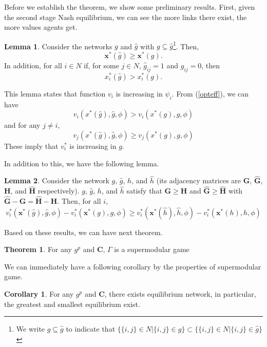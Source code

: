 \documentclass[12pt]{article}
\theoremstyle{definition}
\newtheorem{theorem}{Theorem}
\newtheorem{lemma}{Lemma}
\newtheorem{corollary}{Corollary}
\newcommand{\bm}[1]{\boldsymbol{#1}}
\begin{document}
Before we establish the theorem, we show some preliminary results.
First, given the second stage Nash equilibrium, we can see the more links there exist, the more values agents get.

\begin{lemma}
	Consider the networks $g$ and $\hat{g}$ with $g \subseteq \hat{g}$\footnote{We write $g \subseteq \hat{g}$ to indicate that $\{\{i,j\} \in N | \{i,j\} \in g\} \subset \{\{i,j\} \in N | \{i,j\} \in \hat{g}\}$}.
	Then,
	\[ \bm{x}^*(\hat{g}) \ge \bm{x}^*(g). \]
	In addition, for all $i \in N$ if, for some $j \in N$, $\hat{g}_{ij} = 1$ and $g_{ij} = 0$, then
	\[ x_i^*(\hat{g}) > x_i^*(g). \]
\end{lemma}

This lemma states that function $v_i$ is increasing in $\psi_i$.
From (\ref{opteff}), we can have 
\[ v_i(x^*(\hat{g}), \hat{g}, \phi) > v_i(x^*(g), g, \phi)\]
and for any $j \neq i$,
\[ v_j(x^*(\hat{g}), \hat{g}, \phi) \ge v_j(x^*(g), g, \phi)\]
These imply that $v_i^*$ is increasing in $g$.

In addition to this, we have the following lemma.

\begin{lemma}
	Consider the network $g$, $\hat{g}$, $h$, and $\hat{h}$ (its adjacency matrices are $\bm{G}$, $\bm{\hat{G}}$, $\bm{H}$, and $\bm{\hat{H}}$ respectively).
	$g$, $\hat{g}$, $h$, and $\hat{h}$ satisfy that $\bm{G} \ge \bm{H}$ and  $\bm{\hat{G}} \ge \bm{\hat{H}}$ with $\bm{\hat{G}} - \bm{G} = \bm{\hat{H}} - \bm{H}$.
	Then, for all $i$,
	\[ v_i^*(\bm{x}^*(\hat{g}), \hat{g}, \phi) - v_i^*(\bm{x}^*(g), g, \phi) \ge v_i^*(\bm{x}^*(\hat{h}), \hat{h}, \phi) - v_i^*(\bm{x}^*(h), h, \phi)\]
\end{lemma}

Based on these results, we can have next theorem.

\begin{theorem}
	For any $g^p$ and $\bm{C}$, $\Gamma$ is a supermodular game
\end{theorem}

We can immediately have a following corollary by the properties of supermodular game.

\begin{corollary}
	For any $g^p$ and $\bm{C}$, there exists equilibrium network, in particular, the greatest and smallest equilibrium exist.
\end{corollary}
\end{document}

